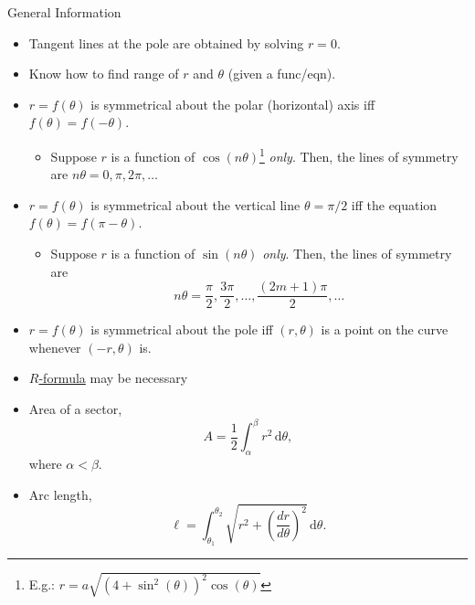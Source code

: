 \documentclass[oneside]{book}
\begin{document}
\begin{stbox}{General Information}{}
\begin{itemize}[label=\(\circ\)]
\begin{longtable}{|Sc|Sc|Sc|}
\begin{tabular}{@{}Sc@{}}
\end{tabular}& \(x^2+\left(y-\dfrac{a}{2}\right)^2=\dfrac{a^2}{4}\)\\
\hline
    \end{longtable}
    \item Tangent lines at the pole are obtained by solving \(r=0\).
    \item Know how to find range of \(r\) and \(\theta\) (given a func/eqn).
    \item \(r=f(\theta)\) is symmetrical about the polar (horizontal) axis iff \(f(\theta)=f(-\theta)\).
    \begin{itemize}
      \item Suppose \(r\) is a function of \(\cos(n\theta)\)\footnote{E.g.: \(r=a\sqrt{(4+\sin^2(\theta))^2\cos(\theta)}\)} \emph{only}. Then, the lines of symmetry are \(n\theta=0,\pi,2\pi,\ldots\)
    \end{itemize}
    \item \(r=f(\theta)\) is symmetrical about the vertical line \(\theta=\pi/2\) iff the equation \(f(\theta)=f(\pi-\theta)\).
    \begin{itemize}
      \item Suppose \(r\) is a function of \(\sin(n\theta)\) \emph{only}. Then, the lines of symmetry are 
      \[n\theta=\frac{\pi}{2},\frac{3\pi}{2},\ldots,\frac{(2m+1)\pi}{2},\ldots\]
    \end{itemize}
    \item \(r=f(\theta)\) is symmetrical about the pole iff \((r,\theta)\) is a point on the curve whenever \((-r,\theta)\) is.
    \item \hyperlink{R-formulas}{\(R\)-formula} may be necessary
    \item Area of a sector, 
    \[A=\dfrac{1}{2}\int_{\alpha}^{\beta}r^2\,\text{d}\theta,\] 
    where \(\alpha<\beta\).
    \item Arc length, 
    \[\ell=\int_{\theta_1}^{\theta_2} \sqrt{r^2+\left(\frac{dr}{d\theta}\right)^2}\,\text{d}\theta.\]
  \end{itemize}
\end{stbox}
\end{document}

